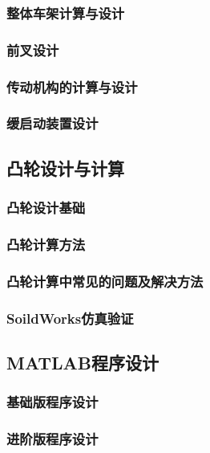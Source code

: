 \subsubsection{整体车架计算与设计}

\subsubsection{前叉设计}

\subsubsection{传动机构的计算与设计}

\subsubsection{缓启动装置设计}


\subsection{凸轮设计与计算}
\subsubsection{凸轮设计基础}
\subsubsection{凸轮计算方法}
\subsubsection{凸轮计算中常见的问题及解决方法}
\subsubsection{SoildWorks仿真验证}


\subsection{MATLAB程序设计}
\subsubsection{基础版程序设计}
\subsubsection{进阶版程序设计}





